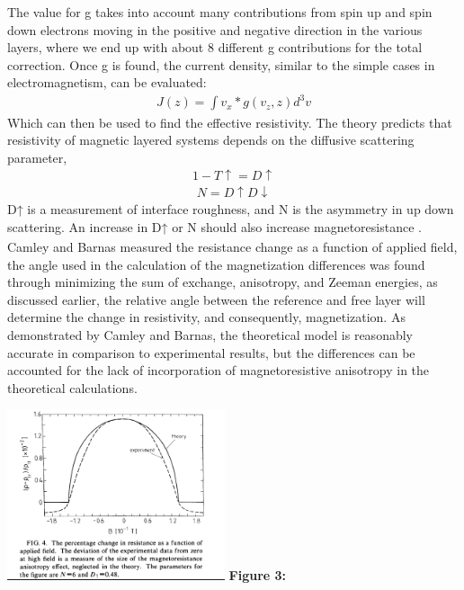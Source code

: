 \documentclass[11pt]{article}
\begin{document}
\begin{multicols}{2}
The value for g takes into account many contributions from spin up and spin down electrons moving in the positive and negative direction in the various layers, where we end up with about 8 different g contributions for the total correction. Once g is found, the current density, similar to  the simple cases in electromagnetism,  can be evaluated:
\begin{align*}
J(z) = \int v_x*g(v_z,z)d^3 v  
\end{align*}
Which can then be used to find the effective resistivity. The theory predicts that resistivity of magnetic layered systems depends on the diffusive scattering parameter, 
\begin{align*}
1-T \uparrow= D \uparrow
\end{align*}
\begin{align*}
N = D \uparrow D \downarrow 
\end{align*}
D↑ is a measurement of interface roughness, and N is the asymmetry in up down scattering. An increase in D↑ or N should also increase magnetoresistance \textsubscript{\cite{label2}}. Camley and Barnas measured the resistance change as a function of applied field, the angle used in the calculation of the magnetization differences was found through minimizing the sum of exchange, anisotropy, and Zeeman energies, as discussed earlier, the relative angle between the reference and free layer will determine the change in resistivity, and consequently, magnetization. As demonstrated by Camley and Barnas, the theoretical model is reasonably accurate in comparison to experimental results, but the differences can be accounted for the lack of incorporation of magnetoresistive anisotropy in the theoretical calculations. 

\begin{center}
	\centering
	\includegraphics[width=0.48\textwidth]{exp_vs_theory.png}
	{\footnotesize\textbf{Figure 3:}\textsubscript{\cite{label6}}}
\end{center} 



\end{multicols}
\end{document}
